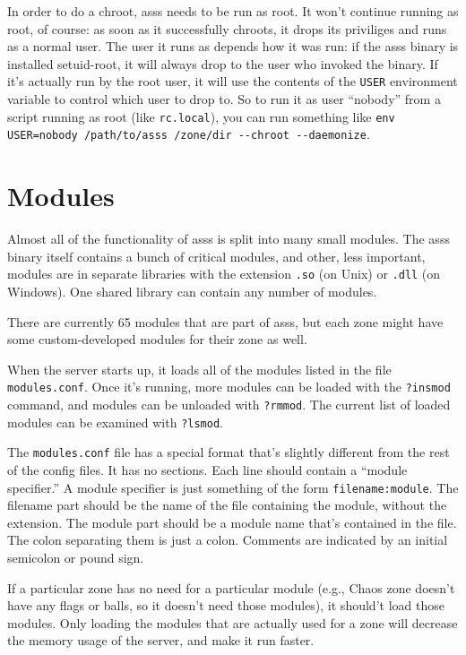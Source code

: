 \documentclass{article}
\newcommand{\asss}{asss}
\begin{document}
In order to do a chroot, \asss{} needs to be run as root. It won't
continue running as root, of course: as soon as it successfully chroots,
it drops its priviliges and runs as a normal user. The user it runs as
depends how it was run: if the \asss{} binary is installed setuid-root,
it will always drop to the user who invoked the binary. If it's actually
run by the root user, it will use the contents of the \verb/USER/
environment variable to control which user to drop to. So to run it as
user ``nobody'' from a script running as root (like \verb/rc.local/),
you can run something like
\verb|env USER=nobody /path/to/asss /zone/dir --chroot --daemonize|.


\section{Modules}

Almost all of the functionality of \asss{} is split into many small
modules. The \asss{} binary itself contains a bunch of critical modules,
and other, less important, modules are in separate libraries with the
extension \verb/.so/ (on Unix) or \verb/.dll/ (on Windows). One shared
library can contain any number of modules.

There are currently
65
modules that are part of \asss{}, but each zone might have some
custom-developed modules for their zone as well.

When the server starts up, it loads all of the modules listed in the
file \verb/modules.conf/. Once it's running, more modules can be loaded
with the \verb/?insmod/ command, and modules can be unloaded with
\verb/?rmmod/. The current list of loaded modules can be examined with
\verb/?lsmod/.

The \verb/modules.conf/ file has a special format that's slightly
different from the rest of the config files. It has no sections. Each
line should contain a ``module specifier.'' A module specifier is just
something of the form \verb/filename:module/. The filename part should
be the name of the file containing the module, without the extension.
The module part should be a module name that's contained in the file.
The colon separating them is just a colon. Comments are indicated by an
initial semicolon or pound sign.

If a particular zone has no need for a particular module (e.g., Chaos
zone doesn't have any flags or balls, so it doesn't need those modules),
it should't load those modules. Only loading the modules that are
actually used for a zone will decrease the memory usage of the server,
and make it run faster.
\end{document}
